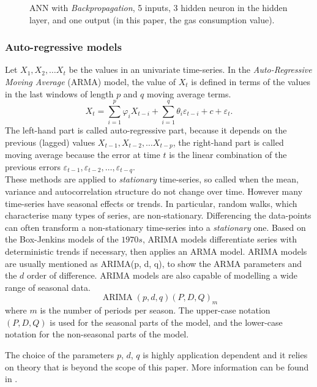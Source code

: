 \documentclass{sig-alternate-sigmod07}
\begin{document}
\begin{figure}[h!]
\centering
{}
\caption{ANN with \emph{Backpropagation}, 5 inputs, 3 hidden neuron in the hidden layer, and one output (in this paper, the gas consumption value).}
\label{fig:ANN}
\end{figure}


\subsubsection{Auto-regressive models}
Let $X_1, X_2, \ldots X_t$ be the values in an univariate time-series. In the \emph{Auto-Regressive Moving Average} (ARMA) model, the value of $X_t$ is defined in terms of the values in the last windows of length $p$ and $q$ moving average terms.
\begin{displaymath}X_t =  \sum_{i=1}^p \varphi_i X_{t-i} + \sum_{i=1}^q \theta_i \varepsilon_{t-i} + c + \varepsilon_t.\end{displaymath}
The left-hand part is called auto-regressive part, because it depends on the previous (lagged) values $X_{t-1}, X_{t-2}, \ldots X_{t-p}$, the right-hand part is called moving average because the error at time $t$ is the linear combination of the previous errors $\varepsilon_{t-1}, \varepsilon_{t-2}, \ldots, \varepsilon_{t-q}$. \\
These methods are applied to \emph{stationary} time-series, so called when the mean, variance and autocorrelation structure do not change over time. However many time-series have seasonal effects or trends. In particular, random walks,
which characterise many types of series, are non-stationary. Differencing the data-points can often transform a non-stationary time-series into a \emph{stationary} one. Based on the Box-Jenkins models of the $1970s$, ARIMA models differentiate series with deterministic trends if necessary, then applies an ARMA model. ARIMA models are usually mentioned as ARIMA(p, d, q), to show the ARMA parameters and the $d$ order of difference. ARIMA models are also capable of modelling a wide range of seasonal data. 
\begin{displaymath}
\operatorname{ARIMA}(p,d,q) (P,D,Q)_m
\end{displaymath}
where $m$ is the number of periods per season. The upper-case notation $(P,D,Q)$ is used for the seasonal parts of the model, and the lower-case notation for the non-seasonal parts of the model.

The choice of the parameters $p$, $d$, $q$ is highly application dependent and it relies on theory that is beyond the scope of this paper. More information can be found in \cite{rousseeuw2005robust}.
\end{document}

